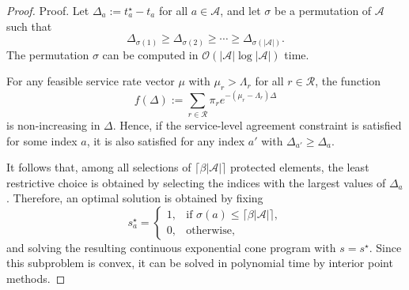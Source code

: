 \documentclass[10pt,a4paper]{amsart}
\begin{document}
\begin{proof}{Proof.}
Let $\Delta_a:=t_a^\star-t_a$ for all $a\in\mathcal A$, and let $\sigma$ be a
permutation of $\mathcal A$ such that
$$
\Delta_{\sigma(1)} \ge \Delta_{\sigma(2)} \ge \cdots \ge \Delta_{\sigma(|\mathcal A|)}.
$$
The permutation $\sigma$ can be computed in
$\mathcal O(|\mathcal A|\log|\mathcal A|)$ time.

For any feasible service rate vector $\mu$ with $\mu_r>\Lambda_r$ for all
$r\in\mathcal R$, the function
$$
f(\Delta):=\sum_{r\in\mathcal R}\pi_r e^{-(\mu_r-\Lambda_r)\Delta}
$$
is non-increasing in $\Delta$.
Hence, if the service-level agreement constraint is satisfied for some index $a$,
it is also satisfied for any index $a'$ with $\Delta_{a'}\ge\Delta_a$.

It follows that, among all selections of
$\lceil\beta|\mathcal A|\rceil$ protected elements, the least restrictive choice
is obtained by selecting the indices with the largest values of $\Delta_a$.
Therefore, an optimal solution is obtained by fixing
$$
s^\star_a=
\begin{cases}
1, & \text{if } \sigma(a)\le \lceil\beta|\mathcal A|\rceil,\\
0, & \text{otherwise},
\end{cases}
$$
and solving the resulting continuous exponential cone program with $s=s^\star$.
Since this subproblem is convex, it can be solved in polynomial time by interior
point methods.%
\end{proof}
\end{document}
